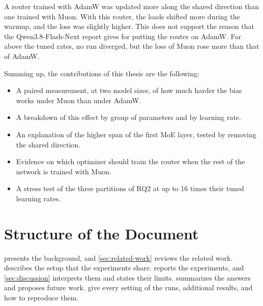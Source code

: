 A router trained with AdamW was updated more along the shared direction than one trained with Muon. With this router, the loads shifted more during the warmup, and the loss was slightly higher. This does not support the reason that the Qwen3.8-Flash-Next report gives for putting the router on AdamW\@. Far above the tuned rates, no run diverged, but the loss of Muon rose more than that of AdamW.

Summing up, the contributions of this thesis are the following:
\begin{itemize}
  \item A paired measurement, at two model sizes, of how much harder the bias works under Muon than under AdamW.
  \item A breakdown of this effect by group of parameters and by learning rate.
  \item An explanation of the higher span of the first MoE layer, tested by removing the shared direction.
  \item Evidence on which optimizer should train the router when the rest of the network is trained with Muon.
  \item A stress test of the three partitions of RQ2 at up to 16 times their tuned learning rates.
\end{itemize}

\section{Structure of the Document}
\label{sec:introduction-structure}
 presents the background, and \cref{sec:related-work} reviews the related work.  describes the setup that the experiments share.  reports the experiments, and \cref{sec:discussion} interprets them and states their limits.  summarizes the answers and proposes future work.  give every setting of the runs, additional results, and how to reproduce them.
